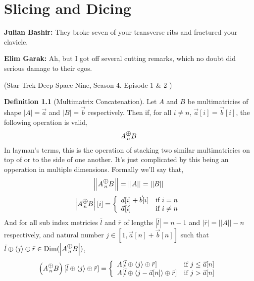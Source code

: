 \documentclass[12pt]{book}
\theoremstyle{plain}
\theoremstyle{definition}
\newtheorem{definition}{Definition}[chapter]
\theoremstyle{ppart}
\theoremstyle{case}
\theoremstyle{solution}
\DeclareMathOperator{\Dim}{Dim}
\newcommand{\mconcat}[1]{\text{\raisebox{1ex}{$\underset{#1}{\oplus}$}}}
\newcommand{\shape}[1]{\left|#1\right|}
\begin{document}
\chapter{Slicing and Dicing}

\begin{displayquote}
\textbf{Julian Bashir:} They broke seven of your transverse ribs and fractured your clavicle.

\textbf{Elim Garak:} Ah, but I got off several cutting remarks, which no doubt did serious damage to their egos.

(Star Trek Deep Space Nine, Season 4. Episode 1 \& 2 \cite{stds9})
\end{displayquote}

\begin{definition}[Multimatrix Concatenation]
Let $A$ and $B$ be multimatricies of shape $\shape{A} = \vec{a}$ and
$\shape{B} = \vec{b}$ respectively. Then if, for all $i \ne n$,
$\vec{a}[i] = \vec{b}[i]$, the following operation is valid,
\[ A \mconcat{n} B \]
In layman's terms, this is the operation of stacking two similar multimatricies on top of or to the side of one another.
It's just complicated by this being an opperation in multiple dimensions.
Formally we'll say that, 
\[ \shape{\shape{A \mconcat{n} B}} = \shape{\shape{A}} = \shape{\shape{B}} \]
\[
  \shape{A \mconcat{n} B}[i] = \left\{
  \begin{array}{ll}
	  \vec{a}[i] + \vec{b}[i] & \mbox{if } i = n \\
	  \vec{a}[i] & \mbox{if } i \ne n
  \end{array}
 \right.
\]
And for all sub index metricies $\bar{l}$ and $\bar{r}$ of lengths $\shape{\bar{l}} = n-1$ and $\shape{\bar{r}} = \shape{\shape{A}}-n$ respectively,
and natural number $j \in [1,\vec{a}[n]+\vec{b}[n]]$ such that $\bar{l} \oplus \left<j\right> \oplus \bar{r} \in \Dim(\shape{A \mconcat{n} B})$,
\[
  \left(A \mconcat{n} B\right)[\bar{l} \oplus \left<j\right> \oplus \bar{r}] = \left\{
  \begin{array}{ll}
	  A[\bar{l} \oplus \left<j\right> \oplus \bar{r}] & \mbox{if } j  \le \vec{a}[n] \\
	  A[\bar{l} \oplus \left<j-\vec{a}[n]\right> \oplus \bar{r}] & \mbox{if } j > \vec{a}[n]
  \end{array}
 \right.
\]
\end{definition}
\end{document}
